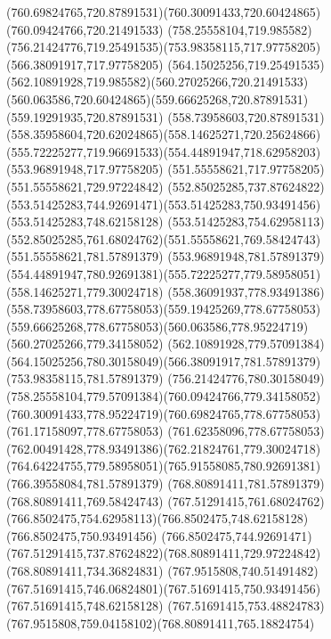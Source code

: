 {{	\curveto(760.69824765,720.87891531)(760.30091433,720.60424865)(760.09424766,720.21491533)
	\curveto(758.25558104,719.985582)(756.21424776,719.25491535)(753.98358115,717.97758205)
	\lineto(566.38091917,717.97758205)
	\curveto(564.15025256,719.25491535)(562.10891928,719.985582)(560.27025266,720.21491533)
	\curveto(560.063586,720.60424865)(559.66625268,720.87891531)(559.19291935,720.87891531)
	\curveto(558.73958603,720.87891531)(558.35958604,720.62024865)(558.14625271,720.25624866)
	\curveto(555.72225277,719.96691533)(554.44891947,718.62958203)(553.96891948,717.97758205)
	\lineto(551.55558621,717.97758205)
	\lineto(551.55558621,729.97224842)
	\curveto(552.85025285,737.87624822)(553.51425283,744.92691471)(553.51425283,750.93491456)
	\lineto(553.51425283,748.62158128)
	\curveto(553.51425283,754.62958113)(552.85025285,761.68024762)(551.55558621,769.58424743)
	\lineto(551.55558621,781.57891379)
	\lineto(553.96891948,781.57891379)
	\curveto(554.44891947,780.92691381)(555.72225277,779.58958051)(558.14625271,779.30024718)
	\curveto(558.36091937,778.93491386)(558.73958603,778.67758053)(559.19425269,778.67758053)
	\curveto(559.66625268,778.67758053)(560.063586,778.95224719)(560.27025266,779.34158052)
	\curveto(562.10891928,779.57091384)(564.15025256,780.30158049)(566.38091917,781.57891379)
	\lineto(753.98358115,781.57891379)
	\curveto(756.21424776,780.30158049)(758.25558104,779.57091384)(760.09424766,779.34158052)
	\curveto(760.30091433,778.95224719)(760.69824765,778.67758053)(761.17158097,778.67758053)
	\curveto(761.62358096,778.67758053)(762.00491428,778.93491386)(762.21824761,779.30024718)
	\curveto(764.64224755,779.58958051)(765.91558085,780.92691381)(766.39558084,781.57891379)
	\lineto(768.80891411,781.57891379)
	\lineto(768.80891411,769.58424743)
	\curveto(767.51291415,761.68024762)(766.8502475,754.62958113)(766.8502475,748.62158128)
	\lineto(766.8502475,750.93491456)
	\curveto(766.8502475,744.92691471)(767.51291415,737.87624822)(768.80891411,729.97224842)
	\closepath
	\moveto(768.80891411,734.36824831)
	\curveto(767.9515808,740.51491482)(767.51691415,746.06824801)(767.51691415,750.93491456)
	\lineto(767.51691415,748.62158128)
	\curveto(767.51691415,753.48824783)(767.9515808,759.04158102)(768.80891411,765.18824754)
	\closepath
}
}
{
}

